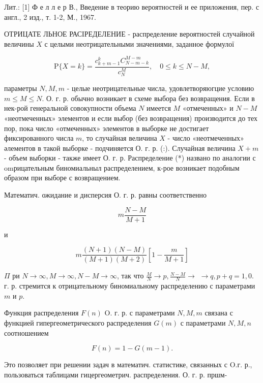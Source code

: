 \documentclass[10pt]{article}
\begin{document}
Лит.: [1] Ф е л л е р В., Введение в теорию вероятностей и ее приложения, пер. с англ., 2 изд., т. 1-2, М., 1967.

ОТРИЦАТЕ ЛЬНОЕ РАСІРЕДЕЛЕНИЕ - распределение вероятностей случайной величины $X$ с целыми неотрицательными значениями, заданное формулої

\[
\mathrm{P}\{X=k\}=\frac{c_{k+m-1}^{k} C_{N-m-k}^{M-m}}{c_{N}^{M}}, \quad 0 \leqslant k \leqslant N-M,
\]

параметры $N, M, m$ - целые неотрицательные числа, удовлетворяюгцие условию $m \leqslant M \leqslant N$. О. г. р. обычно возникает в схеме выбора без возвращения. Если в нек-рой генеральной совокупности объема $N$ имеется $M$ «отмеченных» и $N-M$ «неотмеченных» элементов и если выбор (без возвращения) производится до тех пор, пока число «отмеченных» элементов в выборке не достигает фиксированного числа $m$, то случайная величина $X$ - число «неотмеченных» әлементов в такой выборке - подчиняется О. г. р. (:). Случайная величина $X+m$ - объем выборки - также имеет О. г. р. Распределение (*) названо по аналогии с omрицательным биномиальныл распределением, к-рое возникает подобным образом при выборе с возвращением.

Математич. ожидание и дисперсия О. г. р. равны соответственно

\[
m \frac{N-M}{M+1}
\]

и

\[
m \frac{(N+1)(N-M)}{(M+1)(M+2)}\left[1-\frac{m}{M+1}\right]
\]

$\Pi$ ри $N \rightarrow \infty, M \rightarrow \infty, N-M \rightarrow \infty$, так что $\frac{M}{N} \rightarrow p, \frac{N-M}{N} \rightarrow$ $\rightarrow q, p+q=1,0$. г. р. стремится к отрицательному биномиальному распределению с параметрами $m$ и $p$.

Функция распределения $F(n)$ O. г. р. с параметрами $N, M, m$ связана с функцией гипергеометрического распределения $G(m)$ с параметрами $N, M, n$ соотношением

\[
F(n)=1-G(m-1) .
\]

Это позволяет при решении задач в математич. статистике, связанных с O.г. р., пользоваться таблицами гицергеометрич. распределения. О. г. р. пршм-
\end{document}
